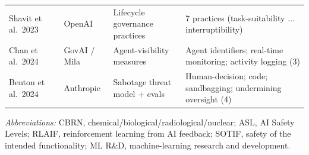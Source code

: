 {\begin{longtable}{@{}p{2.15cm}p{1.7cm}p{3.5cm}p{6.35cm}@{}}
Shavit et al.\ 2023~\cite{shavit2023} & OpenAI & Lifecycle governance practices & 7 practices (task-suitability $\ldots$ interruptibility) \\
Chan et al.\ 2024~\cite{chan2024} & GovAI / Mila & Agent-visibility measures & Agent identifiers; real-time monitoring; activity logging (3) \\
Benton et al.\ 2024~\cite{benton2024} & Anthropic & Sabotage threat model $+$ evals & Human-decision; code; sandbagging; undermining oversight (4) \\
\end{longtable}
\vspace{-4pt}
{\footnotesize\itshape Abbreviations:} {\footnotesize CBRN, chemical/biological/radiological/nuclear; ASL, AI Safety Levels; RLAIF, reinforcement learning from AI feedback; SOTIF, safety of the intended functionality; ML R\&D, machine-learning research and development.}
}
